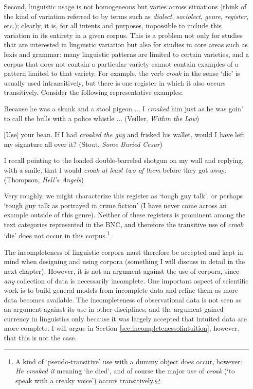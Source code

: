 Second, linguistic usage is not homogeneous but varies across situations (think of the kind of variation referred to by terms such as \emph{dialect}, \emph{sociolect}, \emph{genre}, \emph{register}, etc.); clearly, it is, for all intents and purposes, impossible to include this variation in its entirety in a given corpus. This is a problem not only for studies that are interested in linguistic variation but also for studies in core areas such as lexis and grammar: many linguistic patterns are limited to certain varieties, and a corpus that does not contain a particular variety cannot contain examples of a pattern limited to that variety. For example, the verb \textit{croak} in the sense `die' is usually used intransitively, but there is one register in which it also occurs transitively. Consider the following representative examples:

\begin{exe}
\ex
\begin{xlist} 
\label{ex:croaksb}

\ex Because he was a skunk and a stool pigeon ... I \textit{croaked} him just as he was goin' to call the bulls with a police whistle ... (Veiller, \textit{Within the Law})

\ex $[$Use$]$ your bean. If I had \textit{croaked the guy} and frisked his wallet, would I have left my signature all over it? (Stout, \textit{Some Buried Cesar})

\ex I recall pointing to the loaded double-barreled shotgun on my wall and replying, with a smile, that I would \textit{croak at least two of them} before they got away. (Thompson, \textit{Hell's Angels})

\end{xlist}
\end{exe}

Very roughly, we might characterize this register as `tough guy talk', or perhaps `tough guy talk as portrayed in crime fiction' (I have never come across an example outside of this genre). Neither of these registers is prominent among the text categories represented in the BNC, and therefore the transitive use of \textit{croak} `die' does not occur in this corpus.\footnote{A kind of `pseudo-transitive' use with a dummy object does occur, however: \textit{He croaked it} meaning `he died', and of course the major use of \textit{croak} (`to speak with a creaky voice') occurs transitively.} 

The incompleteness of linguistic corpora must therefore be accepted and kept in mind when designing and using corpora (something I will discuss in detail in the next chapter). However, it is not an argument against the use of corpora, since \emph{any} collection of data is necessarily incomplete. One important aspect of scientific work is to build general models from incomplete data and refine them as more data becomes available. The incompleteness of observational data is not seen as an argument against its use in other disciplines, and the argument gained currency in linguistics only because it was largely accepted that intuited data are more complete. I will argue in Section \ref{sec:incompletenessofintuition}, however, that this is not the case.

